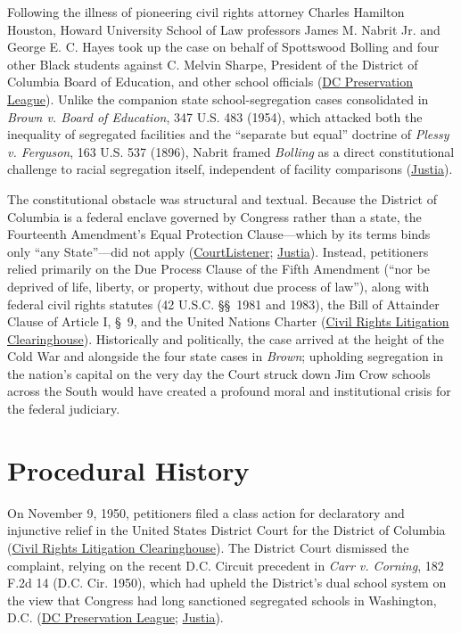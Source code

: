 \documentclass[12pt]{article}
\begin{document}
Following the illness of pioneering civil rights attorney Charles Hamilton Houston, Howard University School of Law professors James M. Nabrit Jr. and George E. C. Hayes took up the case on behalf of Spottswood Bolling and four other Black students against C. Melvin Sharpe, President of the District of Columbia Board of Education, and other school officials (\href{https://historicsites.dcpreservation.org/items/show/969}{DC Preservation League}). Unlike the companion state school-segregation cases consolidated in \textit{Brown v. Board of Education}, 347 U.S. 483 (1954), which attacked both the inequality of segregated facilities and the ``separate but equal'' doctrine of \textit{Plessy v. Ferguson}, 163 U.S. 537 (1896), Nabrit framed \textit{Bolling} as a direct constitutional challenge to racial segregation itself, independent of facility comparisons (\href{https://supreme.justia.com/cases/federal/us/347/497/}{Justia}).

The constitutional obstacle was structural and textual. Because the District of Columbia is a federal enclave governed by Congress rather than a state, the Fourteenth Amendment's Equal Protection Clause---which by its terms binds only ``any State''---did not apply (\href{https://www.courtlistener.com/opinion/105222/bolling-v-sharpe/}{CourtListener}; \href{https://supreme.justia.com/cases/federal/us/347/497/}{Justia}). Instead, petitioners relied primarily on the Due Process Clause of the Fifth Amendment (``nor be deprived of life, liberty, or property, without due process of law''), along with federal civil rights statutes (42 U.S.C. \S\S~1981 and 1983), the Bill of Attainder Clause of Article I, \S~9, and the United Nations Charter (\href{https://clearinghouse.net/case/11110/}{Civil Rights Litigation Clearinghouse}). Historically and politically, the case arrived at the height of the Cold War and alongside the four state cases in \textit{Brown}; upholding segregation in the nation's capital on the very day the Court struck down Jim Crow schools across the South would have created a profound moral and institutional crisis for the federal judiciary.

\section{Procedural History}

On November 9, 1950, petitioners filed a class action for declaratory and injunctive relief in the United States District Court for the District of Columbia (\href{https://clearinghouse.net/case/11110/}{Civil Rights Litigation Clearinghouse}). The District Court dismissed the complaint, relying on the recent D.C. Circuit precedent in \textit{Carr v. Corning}, 182 F.2d 14 (D.C. Cir. 1950), which had upheld the District's dual school system on the view that Congress had long sanctioned segregated schools in Washington, D.C. (\href{https://historicsites.dcpreservation.org/items/show/969}{DC Preservation League}; \href{https://supreme.justia.com/cases/federal/us/347/497/}{Justia}).
\end{document}
